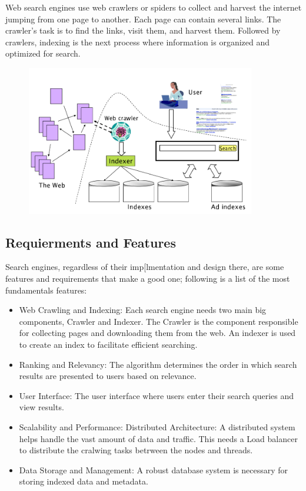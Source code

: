 Web search engines use web crawlers or spiders to collect and harvest the internet jumping from one page to another. Each page can contain several links. The crawler's task is to find the links, visit them, and harvest them. Followed by crawlers, indexing is the next process where information is organized and optimized for search. 

\begin{figure}[h]	
     \centering
         \includegraphics[width=10cm]{images/engine_components.png}
\end{figure}

\subsection{Requierments and Features}
Search engines, regardless of their imp[lmentation and design there, are some features and requirements that make a good one; following is a list of the most fundamentals features:  

\begin{itemize}
  \item Web Crawling and Indexing: Each search engine needs two main big components, Crawler and Indexer. The Crawler is the component responsible for collecting pages and downloading them from the web. An indexer is used to create an index to facilitate efficient searching.
  \item Ranking and Relevancy: The algorithm determines the order in which search results are presented to users based on relevance.
  \item User Interface: The user interface where users enter their search queries and view results.
  \item Scalability and Performance: Distributed Architecture: A distributed system helps handle the vast amount of data and traffic. This needs a Load balancer to distribute the cralwing tasks betrween the nodes and threads. 
  \item Data Storage and Management: A robust database system is necessary for storing indexed data and metadata.
\end{itemize}

